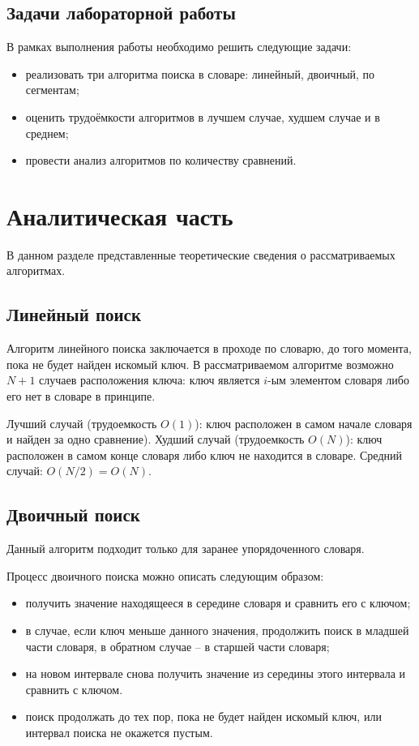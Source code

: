 \documentclass[12pt]{report}
\begin{document}
\section*{Задачи лабораторной работы}
	
В рамках выполнения работы необходимо решить следующие задачи:
	
\begin{itemize}
	\item реализовать три алгоритма поиска в словаре: линейный, двоичный, по сегментам;
	\item оценить трудоёмкости алгоритмов в лучшем случае, худшем случае и в среднем;
	\item провести анализ алгоритмов по количеству сравнений.
\end{itemize}
	
\chapter{Аналитическая часть}
	
В данном разделе представленные теоретические сведения о рассматриваемых алгоритмах.
	
\section{Линейный поиск}
	
Алгоритм линейного поиска заключается в проходе по словарю, до того момента, пока не будет найден искомый ключ. В рассматриваемом алгоритме возможно $N + 1$ случаев расположения ключа: ключ является $i$-ым элементом словаря либо его нет в словаре в принципе. 
	
Лучший случай (трудоемкость $O(1)$): ключ расположен в самом начале словаря и найден за одно сравнение). Худший случай (трудоемкость $O(N)$): ключ расположен в самом конце словаря либо ключ не находится в словаре. Средний случай: $O(N/2) = O(N)$.
	
\section{Двоичный поиск}
	
Данный алгоритм подходит только для заранее упорядоченного словаря.
	
Процесс двоичного поиска можно описать следующим образом: 
	
\begin{itemize}
	\item получить значение находящееся в середине словаря и сравнить его с ключом;
	\item в случае, если ключ меньше данного значения, продолжить поиск в младшей части словаря, в обратном случае -- в старшей части словаря;
	\item на новом интервале снова получить значение из середины этого интервала и сравнить с ключом.
	\item поиск продолжать до тех пор, пока не будет найден искомый ключ, или интервал поиска не окажется пустым.
\end{itemize}
	
\end{document}
